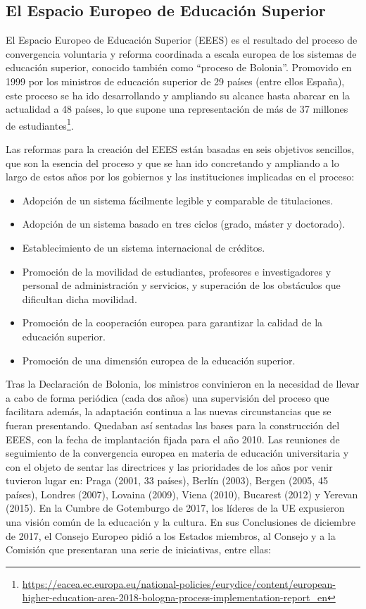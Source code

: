 \subsection{El Espacio Europeo de Educación Superior} \label{sec:eees}

El Espacio Europeo de Educación Superior (EEES) es el resultado del proceso de convergencia voluntaria y reforma coordinada a escala europea de los sistemas de educación superior, conocido también como ``proceso de Bolonia''. Promovido en 1999 por los ministros de educación superior de 29 países (entre ellos España), este proceso se ha ido desarrollando y ampliando su alcance hasta abarcar en la actualidad a 48 países, lo que supone una representación de más de 37 millones de estudiantes\footnote{\url{https://eacea.ec.europa.eu/national-policies/eurydice/content/european-higher-education-area-2018-bologna-process-implementation-report_en}}.

Las reformas para la creación del EEES están basadas en seis objetivos sencillos, que son la esencia del proceso y que se han ido concretando y ampliando a lo largo de estos años por los gobiernos y las instituciones implicadas en el proceso:

\begin{itemize}
\itemsep 0mm
\item Adopción de un sistema fácilmente legible y comparable de titulaciones.
\item Adopción de un sistema basado en tres ciclos (grado, máster y doctorado).
\item Establecimiento de un sistema internacional de créditos.
\item Promoción de la movilidad de estudiantes, profesores e investigadores y personal de administración y servicios, y superación de los obstáculos que dificultan dicha movilidad.
\item Promoción de la cooperación europea para garantizar la calidad de la educación superior.
\item Promoción de una dimensión europea de la educación superior.
\end{itemize}

Tras la Declaración de Bolonia, los ministros convinieron en la necesidad de llevar a cabo de forma periódica (cada dos años) una supervisión del proceso que facilitara además, la adaptación continua a las nuevas circunstancias que se fueran presentando. Quedaban así sentadas las bases para la construcción del EEES, con la fecha de implantación fijada para el año 2010. Las reuniones de seguimiento de la convergencia europea en materia de educación universitaria y con el objeto de sentar las directrices y las prioridades de los años por venir tuvieron lugar en: Praga (2001, 33 países), Berlín (2003), Bergen (2005, 45 países), Londres (2007), Lovaina (2009), Viena (2010), Bucarest (2012) y Yerevan (2015). En la Cumbre de Gotemburgo de 2017, los líderes de la UE expusieron una visión común de la educación y la cultura. En sus Conclusiones de diciembre de 2017, el Consejo Europeo pidió a los Estados miembros, al Consejo y a la Comisión que presentaran una serie de iniciativas, entre ellas:


